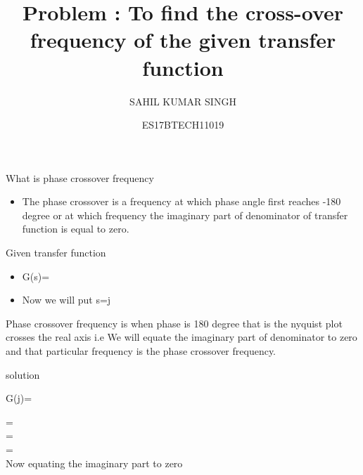 \documentclass{beamer}
\title[Short title]{Problem : To find the cross-over frequency of the  given transfer function} %
\author{SAHIL KUMAR SINGH} %
\institute %
{
CONTROL SYSTEM\\ %
\medskip
}
\date{ES17BTECH11019} %
\begin{document}
\begin{frame}
\titlepage %
\end{frame}






\begin{frame}{What is phase crossover frequency}
    \begin{itemize}
        \item The phase crossover is a frequency at which phase angle first reaches -180 degree or at which frequency the imaginary part of denominator of transfer function is equal to zero.
    \end{itemize}
\end{frame}



\begin{frame}{Given transfer function}
    \begin{itemize}
    
    \item G(s)=
    
\item Now we will put s=j\omega 

\end{itemize}
\item
\begin{itemize}
\newline 
Phase crossover frequency is when phase is 180 degree that is the nyquist plot crosses the real axis i.e We will equate the imaginary part of denominator to zero and that particular frequency is the phase crossover frequency. 
        
    \end{itemize}
\end{frame}


\begin{frame}{solution}
    
      G(j\omega)=
     
      = \\
     
      = \\
     
      = \\
     \vspace{1cm}
     Now equating the imaginary part to zero
    
\end{frame}
\end{document}
